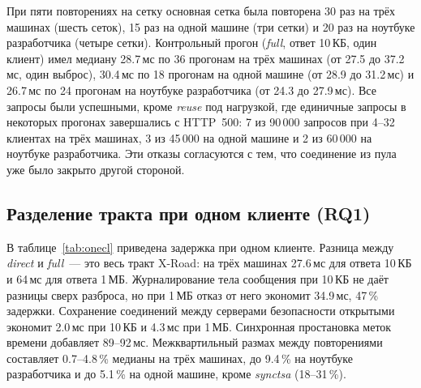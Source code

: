 \documentclass[conference,a4paper]{IEEEtran}
\newcommand{\newtext}[1]{{\color{blue}#1}}
\begin{document}
При пяти повторениях на сетку основная сетка была повторена 30 раз на трёх машинах (шесть сеток), 15
раз на одной машине (три сетки) и 20 раз на ноутбуке разработчика (четыре сетки). Контрольный прогон (\emph{full}, ответ 10\,КБ, один
клиент) имел медиану 28.7\,мс по 36 прогонам на трёх машинах (от 27.5 до 37.2\,мс, один выброс),
30.4\,мс по 18 прогонам на одной машине (от 28.9 до 31.2\,мс) и 26.7\,мс по 24 прогонам на ноутбуке
разработчика (от 24.3 до 27.9\,мс). Все запросы были успешными, кроме \emph{reuse} под нагрузкой, где единичные
запросы в некоторых прогонах завершались с HTTP~500: 7 из 90\,000 запросов при 4--32 клиентах на трёх
машинах, 3 из 45\,000 на одной машине и 2 из 60\,000 на ноутбуке разработчика. Эти отказы
согласуются с тем, что соединение из пула уже было закрыто другой стороной.

\subsection{\newtext{Разделение тракта при одном клиенте (RQ1)}}\label{sec:rq1}

В таблице~\ref{tab:onecl} приведена задержка при одном клиенте. Разница между \emph{direct} и
\emph{full}~--- это весь тракт X-Road: на трёх машинах 27.6\,мс для ответа 10\,КБ и 64\,мс для
ответа 1\,МБ. Журналирование тела сообщения при 10\,КБ не даёт разницы сверх разброса, но при
1\,МБ отказ от него экономит 34.9\,мс, 47\,\% задержки. Сохранение соединений между
серверами безопасности открытыми экономит 2.0\,мс при 10\,КБ и 4.3\,мс при 1\,МБ. Синхронная простановка меток времени добавляет
89--92\,мс. Межквартильный размах между повторениями составляет 0.7--4.8\,\% медианы на трёх машинах, до
9.4\,\% на ноутбуке разработчика и до 5.1\,\% на одной машине, кроме \emph{synctsa}
(18--31\,\%).
\end{document}
